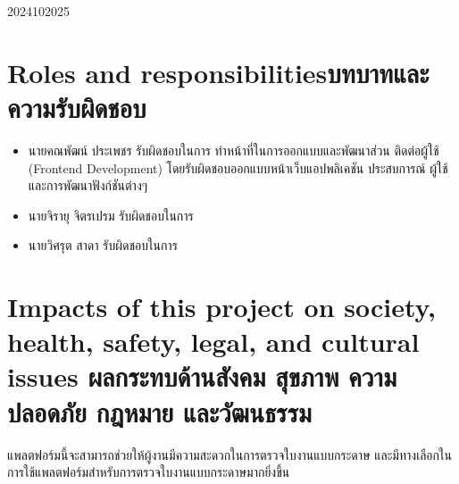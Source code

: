 \begin{plan}{6}{2024}{10}{2025}
\end{plan}


\section{\ifenglish Roles and responsibilities\else บทบาทและความรับผิดชอบ\fi}
    \begin{itemize}
        \item นายคณพัฒน์ ประเพชร รับผิดชอบในการ ทําหน้าที่ในการออกแบบและพัฒนาส่วน
ติดต่อผู้ใช้ (Frontend Development) โดยรับผิดชอบออกแบบหน้าเว็บแอปพลิเคชัน ประสบการณ์
ผู้ใช้ และการพัฒนาฟังก์ชันต่างๆ
        \item นายจิรายุ จิตรเปรม รับผิดชอบในการ
        \item นายวิศรุต สาดา รับผิดชอบในการ
    \end{itemize}

\section{\ifenglish%
Impacts of this project on society, health, safety, legal, and cultural issues
\else%
ผลกระทบด้านสังคม สุขภาพ ความปลอดภัย กฎหมาย และวัฒนธรรม
\fi}
\qquad แพลตฟอร์มนี้จะสามารถช่วยให้ผู้งานมีความสะดวกในการตรวจใบงานแบบกระดาษ และมีทางเลือกในการใช้แพลตฟอร์มสําหรับการตรวจใบงานแบบกระดาษมากยิ่งขึ้น